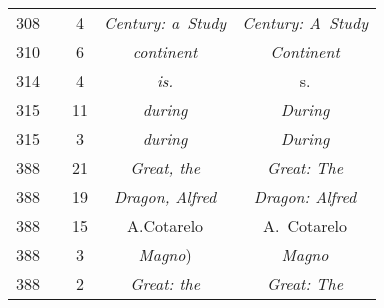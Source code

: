 \documentclass[a4paper,11pt]{article}
\begin{document}
\begin{center}
\begin{tabular}{|c|c|c|c|c|}
    308 & &  4 & \emph{Century: a~Study} & \emph{Century: A~Study} \\
    310 & &  6 & \emph{continent} & \emph{Continent} \\
    314 & &  4 & \emph{is.} & s. \\
    315 & & 11 & \emph{during} & \emph{During} \\
    315 & &  3 & \emph{during} & \emph{During} \\
    388 & & 21 & \emph{Great, the} & \emph{Great: The} \\
    388 & & 19 & \emph{Dragon, Alfred} & \emph{Dragon: Alfred} \\
    388 & & 15 & A.Cotarelo & A.~Cotarelo \\
    388 & &  3 & \emph{Magno}) & \emph{Magno} \\
    388 & &  2 & \emph{Great: the} & \emph{Great: The} \\
    \hline
  \end{tabular}




\end{center}
\end{document}
